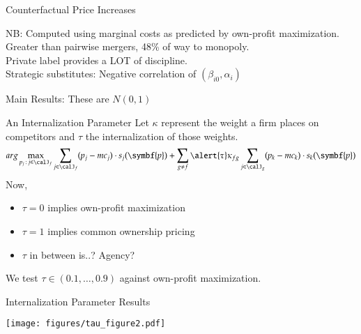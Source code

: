 \begin{frame}[plain, label=merger]{Counterfactual Price Increases}
\begin{center}
\scalebox{0.75}{

}
\end{center}
\vspace{1cm}
NB: Computed using marginal costs as predicted by own-profit maximization.\\
Greater than pairwise mergers, 48\% of way to monopoly.\\
Private label provides a LOT of discipline.\\
Strategic substitutes: Negative correlation of $(\beta_{i0}, \alpha_{i})$
\end{frame}


\begin{frame}[plain,label=mainresults]{Main Results: These are $N(0,1)$}
\begin{center}
\scalebox{0.5}{}
\end{center}
\end{frame}

\begin{frame}[plain]{An Internalization Parameter}
Let $\kappa$ represent the weight a firm places on competitors and $\tau$ the internalization of those weights.
 \begin{equation*}
 arg\max_{p_j \,:\, j \in \calJ_f} \sum_{j \in \calJ_f} (p_j - mc_j) \cdot s_j(\symbf{p})+
 \sum_{g\neq f} \alert{\tau} \kappa_{fg} \sum_{j \in \calJ_g} (p_k - mc_k) \cdot s_k(\symbf{p})
 \end{equation*}
Now, 
\begin{itemize}
\item $\tau = 0$ implies own-profit maximization
\item $\tau = 1$ implies common ownership pricing
\item $\tau$ in between is..? Agency?
\end{itemize}
We test $\tau \in (0.1, \ldots, 0.9)$ against own-profit maximization.
\end{frame}

\begin{frame}[plain]{Internalization Parameter Results}
\begin{center}
\texttt{[image: figures/tau\_figure2.pdf]}
\end{center}
\end{frame}


